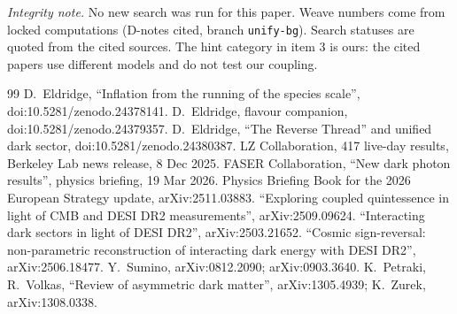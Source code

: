 \documentclass[aps,prd,twocolumn,superscriptaddress,nofootinbib,showkeys]{revtex4-2}
\begin{document}
\emph{Integrity note.} No new search was run for this paper. Weave numbers come from locked computations (D-notes cited, branch \texttt{unify-bg}). Search statuses are quoted from the cited sources. The hint category in item 3 is ours: the cited papers use different models and do not test our coupling.

\begin{thebibliography}{99}
 D.~Eldridge, ``Inflation from the running of the species scale'', doi:10.5281/zenodo.24378141.
 D.~Eldridge, flavour companion, doi:10.5281/zenodo.24379357.
 D.~Eldridge, ``The Reverse Thread'' and unified dark sector, doi:10.5281/zenodo.24380387.
 LZ Collaboration, 417 live-day results, Berkeley Lab news release, 8 Dec 2025.
 FASER Collaboration, ``New dark photon results'', physics briefing, 19 Mar 2026.
 Physics Briefing Book for the 2026 European Strategy update, arXiv:2511.03883.
 ``Exploring coupled quintessence in light of CMB and DESI DR2 measurements'', arXiv:2509.09624.
 ``Interacting dark sectors in light of DESI DR2'', arXiv:2503.21652.
 ``Cosmic sign-reversal: non-parametric reconstruction of interacting dark energy with DESI DR2'', arXiv:2506.18477.
 Y.~Sumino, arXiv:0812.2090; arXiv:0903.3640.
 K.~Petraki, R.~Volkas, ``Review of asymmetric dark matter'', arXiv:1305.4939; K.~Zurek, arXiv:1308.0338.
\end{thebibliography}
\end{document}
